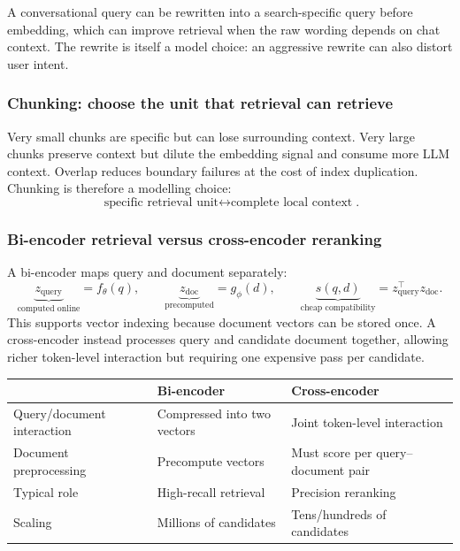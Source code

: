 A conversational query can be rewritten into a search-specific query before embedding, which can improve retrieval when the raw wording depends on chat context.
The rewrite is itself a model choice: an aggressive rewrite can also distort user intent.


\subsubsection{Chunking: choose the unit that retrieval can retrieve}
\label{subsec:llms-chunking}
Very small chunks are specific but can lose surrounding context.
Very large chunks preserve context but dilute the embedding signal and consume more LLM context.
Overlap reduces boundary failures at the cost of index duplication.
Chunking is therefore a modelling choice:
\[
\boxed{
\text{specific retrieval unit}
\longleftrightarrow
\text{complete local context}
}.
\]

\subsubsection{Bi-encoder retrieval versus cross-encoder reranking}
\label{subsec:llms-bi-cross}
A bi-encoder maps query and document separately:
\[
\underbrace{z_{\text{query}}}_{\text{computed online}}
=f_\theta(q),
\qquad
\underbrace{z_{\text{doc}}}_{\text{precomputed}}
=g_\phi(d),
\qquad
\underbrace{s(q,d)}_{\text{cheap compatibility}}
=z_{\text{query}}^\top z_{\text{doc}}.
\]
This supports vector indexing because document vectors can be stored once.
A cross-encoder instead processes query and candidate document together, allowing richer token-level interaction but requiring one expensive pass per candidate.

\begin{center}
\small
\begin{tabularx}{.94\linewidth}{@{}L{.23\linewidth}YY@{}}
\toprule
 & \textbf{Bi-encoder} & \textbf{Cross-encoder} \\
\midrule
Query/document interaction & Compressed into two vectors & Joint token-level interaction \\
Document preprocessing & Precompute vectors & Must score per query--document pair \\
Typical role & High-recall retrieval & Precision reranking \\
Scaling & Millions of candidates & Tens/hundreds of candidates \\
\bottomrule
\end{tabularx}
\end{center}

